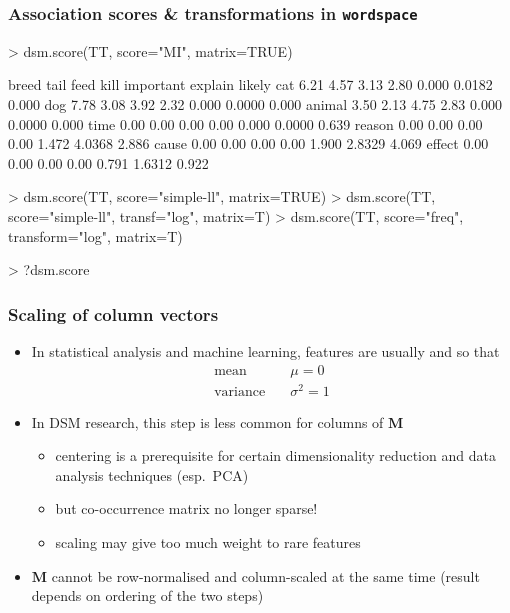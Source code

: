 \documentclass[t]{beamer} %
\begin{document}
\begin{frame}[fragile]
  \frametitle{Association scores \& transformations in \texttt{wordspace}}

\ungap[1]
\begin{Rcode}
> dsm.score(TT, score="MI", matrix=TRUE) \begin{Rout}
       breed tail feed kill important explain likely
cat     6.21 4.57 3.13 2.80     0.000  0.0182  0.000
dog     7.78 3.08 3.92 2.32     0.000  0.0000  0.000
animal  3.50 2.13 4.75 2.83     0.000  0.0000  0.000
time    0.00 0.00 0.00 0.00     0.000  0.0000  0.639
reason  0.00 0.00 0.00 0.00     1.472  4.0368  2.886
cause   0.00 0.00 0.00 0.00     1.900  2.8329  4.069
effect  0.00 0.00 0.00 0.00     0.791  1.6312  0.922
\end{Rout}
> dsm.score(TT, score="simple-ll", matrix=TRUE)
> dsm.score(TT, score="simple-ll", transf="log", matrix=T)
> dsm.score(TT, score="freq", transform="log", matrix=T)

> ?dsm.score 
\end{Rcode}
\end{frame}


\begin{frame}
  \frametitle{Scaling of column vectors}

  \begin{itemize}
  \item In statistical analysis and machine learning, features are
    usually  and  so that
    \begin{align*}
      \text{mean} & \quad \mu = 0 \\
      \text{variance} & \quad \sigma^2 = 1
    \end{align*}
  \item<2-> In DSM research, this step is less common for columns of $\mathbf{M}$
    \begin{itemize}
    \item centering is a prerequisite for certain dimensionality
      reduction and data analysis techniques (esp.\ PCA)
    \item but co-occurrence matrix no longer sparse!
    \item scaling may give too much weight to rare features
    \end{itemize}
  \item<3-> $\mathbf{M}$ cannot be row-normalised and column-scaled at the
    same time (result depends on ordering of the two steps)
  \end{itemize}
\end{frame}
\end{document}
